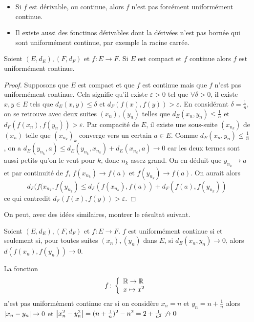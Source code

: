 \begin{remarque}
\begin{itemize}
    \item  Si $f$ est dérivable, ou continue, alors $f$ n'est pas forcément uniformément continue.
    \item Il existe aussi des fonctinos dérivables dont la dérivées n'est pas bornée qui sont uniformément continue, par exemple la racine carrée.
\end{itemize}
\end{remarque}
\begin{proposition}[Heine]
    Soient $(E,d_E), (F,d_F)$ et $f : E\to F$. Si $E$ est compact et $f$ continue alors $f$ est uniformément continue.
\end{proposition}
\begin{proof}
    Supposons que $E$ est compact et que $f$ est continue mais que $f$ n'est pas uniformément continue. Cela signifie qu'il existe $\varepsilon>0$ tel que $\forall\delta>0$, il existe $x,y\in E $ tels que $d_E(x,y)\le \delta$ et $d_F(f(x),f(y))>\varepsilon$. En considérant $\delta = \frac1n$, on se retrouve avec deux suites $(x_n),(y_n)$ telles que $d_E(x_n,y_n)\le \frac1n$ et $d_F(f(x_n),f(y_n))>\varepsilon$. Par compacité de $E$, il existe une sous-suite $(x_{n_k})$ de $(x_n)$ telle que $(x_{n_k})_k$ converge vers un certain $a\in E$. Comme $d_E(x_n,y_n)\le\frac1n$, on a $d_E(y_{n_k},a)\le d_E(y_{n_k}, x_{n_k}) + d_E(x_{n_k}, a)\to 0$ car les deux termes sont aussi petits qu'on le veut pour $k$, donc $n_k$ assez grand.
    On en déduit que $y_{n_k}\to a$ et par continuité de $f$, $f(x_{n_k})\to f(a)$ et $f(y_{n_k})\to f(a)$. On aurait alors $$d_F(f(x_{n_k},f(y_{n_k})\le d_F(f(x_{n_k}),f(a)) + d_F(f(a),f(y_{n_k}))$$
    ce qui contredit $d_F(f(x),f(y))>\varepsilon$.
\end{proof}
On peut, avec des idées similaires, montrer le résultat suivant.
\begin{proposition}[Exercice]
    Soient $(E,d_E), (F,d_F)$ et $f : E\to F$. $f$ est uniformément continue si et seulement si, pour toutes suites $(x_n),(y_n)$ dans $E$, si $d_E(x_n,y_n)\to 0$, alors $d(f(x_n),f(y_n))\to 0$.
\end{proposition}
\begin{exemple}
    La fonction $$f\colon \left\{\begin{array}{l}\mathbb{R}\to\mathbb{R} \\x\mapsto x^2\end{array}\right.$$
    n'est pas uniformément continue car si on considère $x_n = n$ et $y_n = n+\frac1n$ alors $\left| x_n-y_n \right|\to 0$ et $\left| x_n^2-y_n^2 \right| = (n+\frac{1}{n})^2-n^2 = 2 + \frac{1}{n^2} \not\to 0$
\end{exemple}
